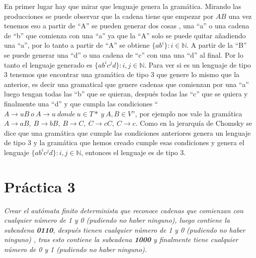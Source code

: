 En primer lugar hay que mirar que lenguaje genera la gramática. Mirando las producciones se puede observar que la cadena tiene que empezar por $AB$ una vez tenemos eso a partir de ``A'' se pueden generar dos cosas , una ``a'' o una cadena de ``b'' que comienza con una ``a'' ya que la ``A'' solo se puede quitar añadiendo una ``a'', por lo tanto a partir de ``A'' se obtiene $\{ab^{i}\} :i \in \mathbb{N} $. A partir de la ``B'' se puede generar una ``d'' o una cadena de ``c'' con una una ``d'' al final. Por lo tanto el lenguaje generado es $\{ab^{i}c^{j}d\}: i,j \in \mathbb{N} $.  Para ver si es un lenguaje de tipo 3 tenemos que encontrar una gramática de tipo 3 que genere lo mismo que la anterior, es decir una gramatical que genere cadenas que comienzan por una ``a'' luego tengan todas las ``b'' que se quieran, después todas las ``c'' que se quiera y finalmente una ``d'' y que cumpla las condiciones ``$A \rightarrow uB\ o\ A\rightarrow u\ donde\ u \in T*\ y \ A,B \in V$'', por ejemplo nos vale la gramática $A\rightarrow aB,\ B\rightarrow bB,\ B\rightarrow C,\ C\rightarrow cC,\ C\rightarrow c$. Como en la jerarquía de Chomsky se dice que una gramática que cumple las condiciones anteriores genera un lenguaje de tipo 3 y la gramática que hemos creado cumple esas condiciones y genera el lenguaje $\{ab^{i}c^{j}d\}: i,j \in \mathbb{N} $, entonces el lenguaje es de tipo 3.

\section{Práctica 3}
\textit{Crear el autómata finito determinista que reconoce cadenas que comienzan con cualquier número de 1 y 0 (pudiendo no haber ninguno), luego contiene la subcadena \textbf{0110}, después tienen cualquier número de 1 y 0 (pudiendo no haber ninguno) , tras esto contiene la subcadena \textbf{1000} y finalmente tiene cualquier número de 0 y 1 (pudiendo no haber ninguno).  }
\newline

